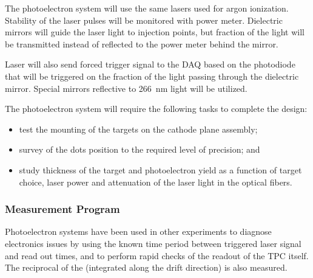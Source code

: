 The photoelectron system will use the same lasers used for argon ionization. Stability of the laser pulses will be monitored  with  power meter. Dielectric mirrors will guide the laser light to injection points, but fraction of the light will be transmitted instead of reflected to the power meter behind the mirror. 

Laser will also send forced trigger signal to the DAQ based on the photodiode that will be triggered on the fraction of the light passing through the dielectric mirror. Special mirrors reflective to \SI{266}{\nano\m} light will be utilized. 

The photoelectron system will require the following tasks to complete the design: 
\begin{itemize}
    \item test the mounting of the targets on the cathode plane assembly; 
    \item survey of the dots position to the required level of precision; and  
    \item study thickness of the target and photoelectron yield as a function of target choice, laser power and attenuation of the laser light in the optical fibers.
\end{itemize}

\subsubsection{Measurement Program}
\label{sec:sp-calib-sys-las-pe-meas}

Photoelectron systems have been used in other experiments to diagnose electronics issues by using the known time period between triggered laser signal and read out times, and to perform rapid checks of the readout of the TPC itself. The reciprocal of the \efield (integrated along the drift direction) is also measured.
